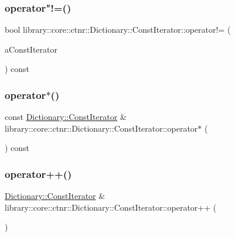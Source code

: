 \subsubsection{\texorpdfstring{operator"!=()}{operator!=()}}
{\footnotesize\ttfamily bool library\+::core\+::ctnr\+::\+Dictionary\+::\+Const\+Iterator\+::operator!= (\begin{DoxyParamCaption}\item[{const \hyperlink{classlibrary_1_1core_1_1ctnr_1_1_dictionary_1_1_const_iterator}{Const\+Iterator} \&}]{a\+Const\+Iterator }\end{DoxyParamCaption}) const}

\mbox{\label{classlibrary_1_1core_1_1ctnr_1_1_dictionary_1_1_const_iterator_af46c0d1dc79f872f721424037dabbd65}} 
\subsubsection{\texorpdfstring{operator$\ast$()}{operator*()}}
{\footnotesize\ttfamily const \hyperlink{classlibrary_1_1core_1_1ctnr_1_1_dictionary_1_1_const_iterator}{Dictionary\+::\+Const\+Iterator} \& library\+::core\+::ctnr\+::\+Dictionary\+::\+Const\+Iterator\+::operator$\ast$ (\begin{DoxyParamCaption}{ }\end{DoxyParamCaption}) const}

\mbox{\label{classlibrary_1_1core_1_1ctnr_1_1_dictionary_1_1_const_iterator_a4af65a62e2c0a1acd45251cc48362031}} 
\subsubsection{\texorpdfstring{operator++()}{operator++()}\hspace{0.1cm}{\footnotesize\ttfamily [1/2]}}
{\footnotesize\ttfamily \hyperlink{classlibrary_1_1core_1_1ctnr_1_1_dictionary_1_1_const_iterator}{Dictionary\+::\+Const\+Iterator} \& library\+::core\+::ctnr\+::\+Dictionary\+::\+Const\+Iterator\+::operator++ (\begin{DoxyParamCaption}{ }\end{DoxyParamCaption})}

